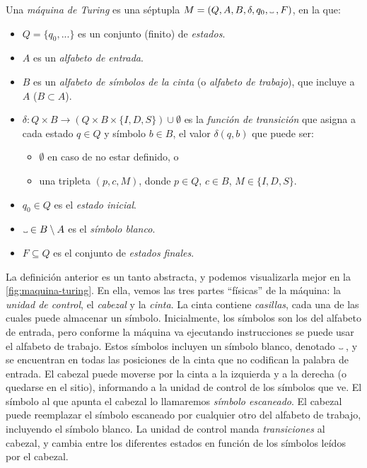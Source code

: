 \begin{definicion}\label{def:maquina-turing}
Una \emph{máquina de Turing} es una séptupla \linebreak $M=(Q, A, B, \delta, q_0, \Vtextvisiblespace\:, F)$, en la que:

\begin{itemize}
    \item $Q = \{q_0, ...\}$ es un conjunto (finito) de \textit{estados}.
    \item $A$ es un \textit{alfabeto de entrada}.
    \item $B$ es un \textit{alfabeto de símbolos de la cinta} (o \emph{alfabeto de trabajo}), que incluye a $A$ ($B\subset A$).
    \item $\delta : Q \times B \longrightarrow (Q \times B \times \{I, D, S\}) \cup \emptyset$ es la \textit{función de transición} que asigna a cada estado $q\in Q$ y símbolo $b\in B$, el valor $\delta(q, b)$ que puede ser:
    \begin{itemize}
        \item $\emptyset$ en caso de no estar definido, o
        \item una tripleta $(p, c, M)$, donde $p\in Q$, $c\in B$, $M \in \{I, D, S\}$.
    \end{itemize}
    \item $q_0\in Q$ es el \textit{estado inicial}.
    \item $\Vtextvisiblespace\in B \setminus A$ es el \textit{símbolo blanco}.
    \item $F \subseteq Q$ es el conjunto de \textit{estados finales}.
\end{itemize}
\end{definicion}

La definición anterior es un tanto abstracta, y podemos visualizarla mejor en la \cref{fig:maquina-turing}. En ella, vemos las tres partes ``físicas'' de la máquina: la \emph{unidad de control}, el \emph{cabezal} y la \emph{cinta}. La cinta contiene \emph{casillas}, cada una de las cuales puede almacenar un símbolo. Inicialmente, los símbolos son los del alfabeto de entrada, pero conforme la máquina va ejecutando instrucciones se puede usar el alfabeto de trabajo. Estos símbolos incluyen un símbolo blanco, denotado $\Vtextvisiblespace\:$, y se encuentran en todas las posiciones de la cinta que no codifican la palabra de entrada. El cabezal puede moverse por la cinta a la izquierda y a la derecha (o quedarse en el sitio), informando a la unidad de control de los símbolos que ve. El símbolo al que apunta el cabezal lo llamaremos \emph{símbolo escaneado}. El cabezal puede reemplazar el símbolo escaneado por cualquier otro del alfabeto de trabajo, incluyendo el símbolo blanco. La unidad de control manda \emph{transiciones} al cabezal, y cambia entre los diferentes estados en función de los símbolos leídos por el cabezal.

